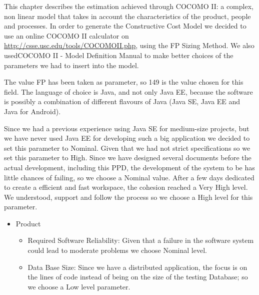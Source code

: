 
This chapter describes the estimation achieved through COCOMO II: a complex, non linear model that takes in account the characteristics of the product, people and processes.
In order to generate the Constructive Cost Model we decided to use an online COCOMO II calculator on \url{http://csse.usc.edu/tools/COCOMOII.php}, using the  FP Sizing Method.
We also usedCOCOMO II - Model Definition Manual to make better choices of the parameters we had to insert into the  model.
\begin{itemize}
    \begin{itemize}
       The value FP has been taken as parameter, so 149 is the value chosen for this field.
       The language of choice is Java, and not only Java EE, because the software is possibly a combination of different flavours of Java  (Java  SE, Java  EE and Java  for Android).
    \end{itemize}
    \begin{itemize}
       Since we had a previous experience using Java SE for medium-size projects, but we have never used Java EE for developing such a big application we  decided to set this parameter to Nominal.
       Given that we had not strict specifications so we set this parameter to High.
       Since we have designed several documents before the actual development, including this PPD, the development of the system to be has little chances of failing, so we choose  a  Nominal value.
       After a few days dedicated to create a efficient and fast workspace, the cohesion reached a Very High  level.
       We understood, support and follow the process so we choose a High level for this parameter.
    \end{itemize}
    \begin{itemize}
      \item Product
        \begin{itemize}
          \item Required Software Reliability: Given that a failure in the software system could lead to moderate problems we choose Nominal level.
          \item Data Base Size:  Since we have a distributed application, the focus is on the lines of code instead of being on the size of the testing Database; so we choose a Low level parameter.

\end{itemize}
\end{itemize}
\end{itemize}
